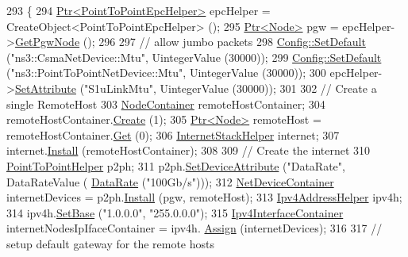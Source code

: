 \begin{DoxyCode}
293 \{
294   \hyperlink{classns3_1_1Ptr}{Ptr<PointToPointEpcHelper>} epcHelper = CreateObject<PointToPointEpcHelper> ();
295   \hyperlink{classns3_1_1Ptr}{Ptr<Node>} pgw = epcHelper->\hyperlink{classns3_1_1PointToPointEpcHelper_a828ac04ae81b0e323f9ccfc08bcacf21}{GetPgwNode} ();
296 
297   \textcolor{comment}{// allow jumbo packets}
298   \hyperlink{group__config_ga2e7882df849d8ba4aaad31c934c40c06}{Config::SetDefault} (\textcolor{stringliteral}{"ns3::CsmaNetDevice::Mtu"}, UintegerValue (30000));
299   \hyperlink{group__config_ga2e7882df849d8ba4aaad31c934c40c06}{Config::SetDefault} (\textcolor{stringliteral}{"ns3::PointToPointNetDevice::Mtu"}, UintegerValue (30000));
300   epcHelper->\hyperlink{classns3_1_1ObjectBase_ac60245d3ea4123bbc9b1d391f1f6592f}{SetAttribute} (\textcolor{stringliteral}{"S1uLinkMtu"}, UintegerValue (30000));
301   
302   \textcolor{comment}{// Create a single RemoteHost}
303   \hyperlink{classns3_1_1NodeContainer}{NodeContainer} remoteHostContainer;
304   remoteHostContainer.\hyperlink{classns3_1_1NodeContainer_a787f059e2813e8b951cc6914d11dfe69}{Create} (1);
305   \hyperlink{classns3_1_1Ptr}{Ptr<Node>} remoteHost = remoteHostContainer.\hyperlink{classns3_1_1NodeContainer_a9ed96e2ecc22e0f5a3d4842eb9bf90bf}{Get} (0);
306   \hyperlink{classns3_1_1InternetStackHelper}{InternetStackHelper} internet;
307   internet.\hyperlink{classns3_1_1InternetStackHelper_a6645b412f31283d2d9bc3d8a95cebbc0}{Install} (remoteHostContainer);
308 
309   \textcolor{comment}{// Create the internet}
310   \hyperlink{classns3_1_1PointToPointHelper}{PointToPointHelper} p2ph;
311   p2ph.\hyperlink{classns3_1_1PointToPointHelper_a4577f5ab8c387e5528af2e0fbab1152e}{SetDeviceAttribute} (\textcolor{stringliteral}{"DataRate"},  DataRateValue (
      \hyperlink{classns3_1_1DataRate}{DataRate} (\textcolor{stringliteral}{"100Gb/s"})));
312   \hyperlink{classns3_1_1NetDeviceContainer}{NetDeviceContainer} internetDevices = p2ph.\hyperlink{classns3_1_1PointToPointHelper_ab9162fea3e88722666fed1106df1f9ec}{Install} (pgw, remoteHost);  
313   \hyperlink{classns3_1_1Ipv4AddressHelper}{Ipv4AddressHelper} ipv4h;
314   ipv4h.\hyperlink{classns3_1_1Ipv4AddressHelper_acf7b16dd25bac67e00f5e25f90a9a035}{SetBase} (\textcolor{stringliteral}{"1.0.0.0"}, \textcolor{stringliteral}{"255.0.0.0"});
315   \hyperlink{classns3_1_1Ipv4InterfaceContainer}{Ipv4InterfaceContainer} internetNodesIpIfaceContainer = ipv4h.
      \hyperlink{classns3_1_1Ipv4AddressHelper_af8e7f4a1a7e74c00014a1eac445a27af}{Assign} (internetDevices);
316   
317   \textcolor{comment}{// setup default gateway for the remote hosts}

\end{DoxyCode}

